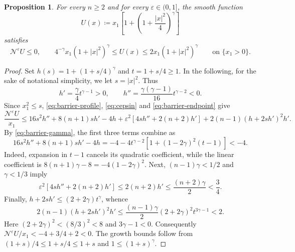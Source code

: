 \documentclass[11pt]{amsart}
\renewcommand{\leq}{\leqslant}
\renewcommand{\geq}{\geqslant}
\newcommand{\eps}{\varepsilon}
\newcommand{\Ne}{\mathcal N^\eps}
\newtheorem{proposition}[theorem]{Proposition}
\theoremstyle{definition}
\theoremstyle{remark}
\numberwithin{equation}{section}
\begin{document}
\begin{proposition}\label{prop:barrier-upper}
For every $n\geq2$ and for every $\eps\in(0,1]$, the smooth function
\[
 U(x)\coloneqq x_1\left[1+\left(1+\frac{|x|^2}{4}\right)^\gamma\right]
\]
satisfies
\begin{equation}\label{eq:barrier-upper}
 \Ne U\leq 0,\qquad
 4^{-\gamma}x_1(1+|x|^2)^\gamma
 \leq U(x)\leq2x_1(1+|x|^2)^\gamma\qquad \text{on $\{x_1>0\}$.}
\end{equation}
\end{proposition}
\begin{proof}
Set $h(s)=1+(1+s/4)^\gamma$ and $t=1+s/4\geq1$. In the following, for the sake of notational simplicity, we let $s=|x|^2.$ Thus
\begin{equation*}
    h'=\frac\gamma4t^{\gamma-1}>0,\qquad h''=\frac{\gamma(\gamma-1)}{16}t^{\gamma-2}<0.
\end{equation*}
Since $x_1^2\leq s$, \eqref{eq:barrier-profile}, \eqref{eq:cepsin} and \eqref{eq:barrier-endpoint}
give
\[
 \frac{\Ne U}{x_1}\leq
 16s^2h''+8(n+1)s h'-4h
 +\eps^2[4s h''+2(n+2)h']
 +2(n-1)(h+2s h')^2h'.
\]
By \eqref{eq:barrier-gamma}, the first three terms combine as
\[
 16s^2h''+8(n+1)s h'-4h
 =-4-4t^{\gamma-2}[1+(1-2\gamma)^2(t-1)]<-4.
\]
Indeed, expansion in $t-1$ cancels its quadratic coefficient, while the
linear coefficient is $8(n+1)\gamma-8=-4(1-2\gamma)^2$.
Next, $(n-1)\gamma<1/2$ and $\gamma<1/3$ imply
\[
 \eps^2[4s h''+2(n+2)h']
 \leq2(n+2)h'\leq\frac{(n+2)\gamma}{2}<\frac34.
\]
Finally, $h+2s h'\leq(2+2\gamma)t^\gamma$, whence
\[
 2(n-1)(h+2s h')^2h'
 \leq\frac{(n-1)\gamma}{2}(2+2\gamma)^2t^{3\gamma-1}<2.
\]
Here $(2+2\gamma)^2<(8/3)^2<8$ and $3\gamma-1<0$.
Consequently $\Ne U/x_1<-4+3/4+2<0$. The growth bounds follow from
$(1+s)/4\leq1+s/4\leq1+s$ and $1\leq(1+s)^\gamma$.
\end{proof}
\end{document}
